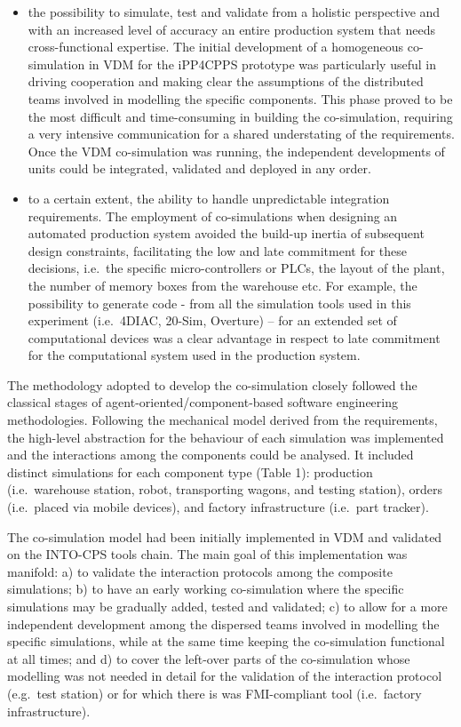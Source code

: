 \begin{itemize}
\item the possibility to simulate, test and validate from a holistic perspective and with an increased level of accuracy an entire production system that needs cross-functional expertise. The initial development of a homogeneous co-simulation in VDM for the iPP4CPPS prototype was particularly useful in driving cooperation and making clear the assumptions of the distributed teams involved in modelling the specific components. This phase proved to be the most difficult and time-consuming in building the co-simulation, requiring a very intensive communication for a shared understating of the requirements. Once the VDM co-simulation was running, the independent developments of units could be integrated, validated and deployed in any order.
\item to a certain extent, the ability to handle unpredictable integration requirements. The employment of co-simulations when designing an automated production system avoided the build-up inertia of subsequent design constraints, facilitating the low and late commitment for these decisions, i.e.\ the specific micro-controllers or PLCs, the layout of the plant, the number of memory boxes from the warehouse etc. For example, the possibility to generate code - from all the simulation tools used in this experiment (i.e.\ 4DIAC, 20-Sim, Overture) -- for an extended set of computational devices was a clear advantage in respect to late commitment for the computational system used in the production system.
\end{itemize}

The methodology adopted to develop the co-simulation closely followed the classical stages of agent-oriented/component-based software engineering methodologies. Following the mechanical model derived from the requirements, the high-level abstraction for the behaviour of each simulation was implemented and the interactions among the components could be analysed. It included distinct simulations for each component type (Table 1): production (i.e.\ warehouse station, robot, transporting wagons, and testing station), orders (i.e.\ placed via mobile devices), and factory infrastructure (i.e.\ part tracker).

The co-simulation model had been initially implemented in VDM and validated on the INTO-CPS tools chain. The main goal of this implementation was manifold: a) to validate the interaction protocols among the composite simulations; b) to have an early working co-simulation where the specific simulations may be gradually added, tested and validated; c) to allow for a more independent development among the dispersed teams involved in modelling the specific simulations, while at the same time keeping the co-simulation functional at all times; and d) to cover the left-over parts of the co-simulation whose modelling was not needed in detail for the validation of the interaction protocol (e.g.\ test station) or for which there is was FMI-compliant tool (i.e.\ factory infrastructure).

